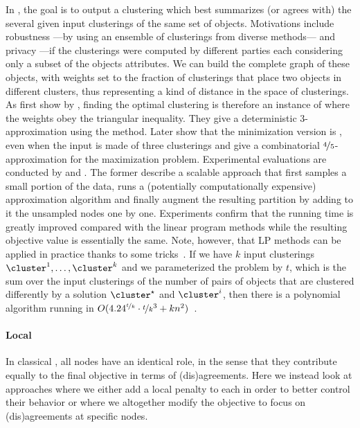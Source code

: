 In \msc{}, the goal is to output a clustering which best summarizes (or agrees with) the several
given input clusterings of the same set of objects.  Motivations include robustness ---by using an
ensemble of clusterings from diverse methods--- and privacy ---if the clusterings were computed by
different parties each considering only a subset of the objects attributes. We can build the
complete graph of these objects, with weights set to the fraction of clusterings that place two
objects in different clusters, thus representing a kind of distance in the space of clusterings.  As
first show by \textcite{Gionis2007}, finding the optimal clustering is therefore an instance of
\pcc{} where the weights obey the triangular inequality. They give a deterministic $3$-approximation
using the \regionGrow{} method. Later \textcite{Bonizzoni2008} show that
the minimization version is \APXh{}, even when the input is made of three clusterings and give a
combinatorial $\nicefrac{4}{5}$-approximation for the maximization problem. Experimental evaluations are
conducted by \textcite{Bertolacci07} and \textcite{Filkov08}. The former describe a scalable
approach that first samples a small portion of the data, runs a (potentially computationally
expensive) approximation algorithm and finally augment the resulting partition by adding to it the
unsampled nodes one by one.  Experiments confirm that the running time is greatly improved compared
with the linear program methods while the resulting objective value is essentially the same. Note,
however, that LP methods can be applied in practice thanks to some tricks~\autocite{ConsensusLP10}.
If we have $k$ input clusterings $\cluster^1,\ldots,\cluster^k$ and we parameterized the problem by
$t$, which is the sum over the input clusterings of the number of pairs of objects that are clustered
differently by a solution $\cluster^\star$ and $\cluster^i$, then there is a polynomial algorithm
running in $O(4.24^{\nicefrac{t}{k}}\cdot \nicefrac{t}{k}^3 +
kn^2)$~\autocite{parameterizedConsensus14}.

\paragraph{Local \pcc{}}

In classical \pcc{}, all nodes have an identical role, in the sense that they contribute equally to
the final objective in terms of (dis)agreements. Here we instead look at approaches where we either
add a local penalty to each in order to better control their behavior or where we altogether modify
the objective to focus on (dis)agreements at specific nodes.

